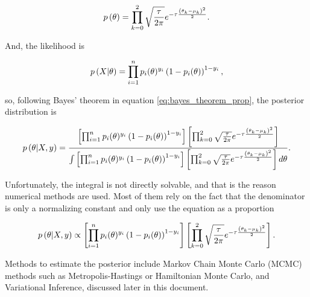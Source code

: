 $$
  p\left( \theta \right) = \prod_{k = 0}^2 \sqrt{\frac{\tau}{2 \pi}} e^{- \tau \frac{\left( \theta_k - \mu_k \right)^2}{2}}.
$$

And, the likelihood is

$$
  p\left( X | \theta \right) = \prod_{i = 1}^n  p_i(\theta)^{y_i}\left(1 - p_i(\theta) \right)^{1 - y_i},
$$

so, following Bayes' theorem in equation \ref{eq:bayes_theorem_prop}, the posterior distribution is

$$
  p\left( \theta | X, y \right) =
    \frac
    {
      \left[ \prod_{i = 1}^n  p_i(\theta)^{y_i}\left(1 - p_i(\theta) \right)^{1 - y_i} \right]
      \left[ \prod_{k = 0}^2 \sqrt{\frac{\tau}{2 \pi}} e^{- \tau \frac{\left( \theta_k - \mu_k \right)^2}{2}} \right]
    }{
      \int \left[ \prod_{i = 1}^n  p_i(\theta)^{y_i}\left(1 - p_i(\theta) \right)^{1 - y_i} \right]
      \left[ \prod_{k = 0}^2 \sqrt{\frac{\tau}{2 \pi}} e^{- \tau \frac{\left( \theta_k - \mu_k \right)^2}{2}} \right] d\theta
    }.
$$

Unfortunately, the integral is not directly solvable, and that is the reason numerical methods are used. Most of them rely on the fact that the denominator is only a normalizing constant and only use the equation as a proportion

$$
  p\left( \theta | X, y \right) \propto
  \left[ \prod_{i = 1}^n  p_i(\theta)^{y_i}\left(1 - p_i(\theta) \right)^{1 - y_i} \right]
  \left[ \prod_{k = 0}^2 \sqrt{\frac{\tau}{2 \pi}} e^{- \tau \frac{\left( \theta_k - \mu_k \right)^2}{2}} \right].
$$

Methods to estimate the posterior include Markov Chain Monte Carlo (MCMC) methods such as Metropolis-Hastings or Hamiltonian Monte Carlo, and Variational Inference, discussed later in this document.


